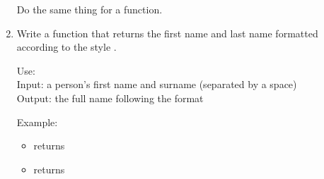 \documentclass[11pt,class=report,crop=false]{standalone}
\begin{document}
\begin{activite}
\begin{enumerate}
   Do the same thing for a  function.
  
   \item Write a function  that returns the first name and last name formatted according to the style .
   
   
  \begin{fonction}
  Use: \\
  Input: a person's first name and surname (separated by a space)\\
  Output: the full name following the format 
  
  \medskip
     
   Example:
   \begin{itemize}  
    \item {} returns 
    \item {} returns 
  \end{itemize} 
  \end{fonction}    
    
\end{enumerate}
\end{activite}


\end{document}
